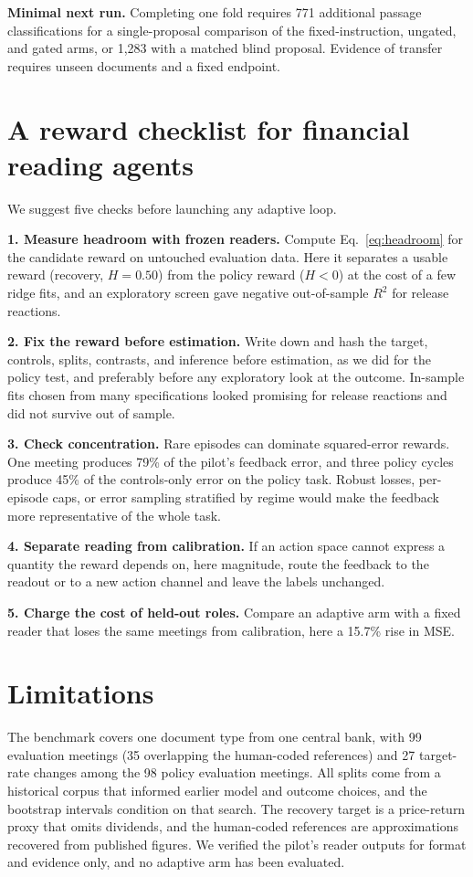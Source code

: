 \documentclass[sigconf]{acmart}
\begin{document}
\textbf{Minimal next run.} Completing one fold requires 771 additional passage classifications for a single-proposal comparison of the fixed-instruction, ungated, and gated arms, or 1,283 with a matched blind proposal. Evidence of transfer requires unseen documents and a fixed endpoint.

\section{A reward checklist for financial reading agents}

We suggest five checks before launching any adaptive loop.

\textbf{1. Measure headroom with frozen readers.} Compute Eq.~\eqref{eq:headroom} for the candidate reward on untouched evaluation data. Here it separates a usable reward (recovery, $H=0.50$) from the policy reward ($H<0$) at the cost of a few ridge fits, and an exploratory screen gave negative out-of-sample $R^2$ for release reactions.

\textbf{2. Fix the reward before estimation.} Write down and hash the target, controls, splits, contrasts, and inference before estimation, as we did for the policy test, and preferably before any exploratory look at the outcome. In-sample fits chosen from many specifications looked promising for release reactions and did not survive out of sample.

\textbf{3. Check concentration.} Rare episodes can dominate squared-error rewards. One meeting produces 79\% of the pilot's feedback error, and three policy cycles produce 45\% of the controls-only error on the policy task. Robust losses, per-episode caps, or error sampling stratified by regime would make the feedback more representative of the whole task.

\textbf{4. Separate reading from calibration.} If an action space cannot express a quantity the reward depends on, here magnitude, route the feedback to the readout or to a new action channel and leave the labels unchanged.

\textbf{5. Charge the cost of held-out roles.} Compare an adaptive arm with a fixed reader that loses the same meetings from calibration, here a 15.7\% rise in MSE.

\section{Limitations}

The benchmark covers one document type from one central bank, with 99 evaluation meetings (35 overlapping the human-coded references) and 27 target-rate changes among the 98 policy evaluation meetings. All splits come from a historical corpus that informed earlier model and outcome choices, and the bootstrap intervals condition on that search. The recovery target is a price-return proxy that omits dividends, and the human-coded references are approximations recovered from published figures. We verified the pilot's reader outputs for format and evidence only, and no adaptive arm has been evaluated.
\end{document}
